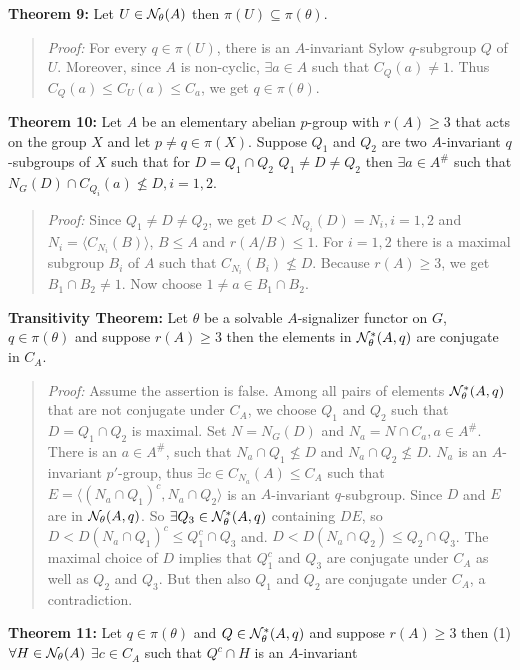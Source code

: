 {\bf Theorem 9:} Let $U \in 
{\cal N}_{\theta}(A)$ then $\pi(U) \subseteq \pi(\theta)$.
\begin{quote}
\emph{Proof:}  
For every $q \in \pi(U)$, there is an $A$-invariant Sylow $q$-subgroup
$Q$ of $U$.  Moreover, since $A$ is non-cyclic, $\exists a \in A$ such that
$C_Q(a) \ne 1$.  Thus $C_Q(a) \le C_U(a) \le C_a$, we get $q \in \pi(\theta)$.
\end{quote}
{\bf Theorem 10:}
Let $A$ be an elementary abelian $p$-group with $r(A) \ge 3$ that acts on the
group $X$ and let $p \ne q \in \pi(X)$.  Suppose $Q_1$
and $Q_2$ are two $A$-invariant $q$-subgroups of $X$ such that for $D= Q_1 \cap Q_2$
$Q_1 \ne D \ne Q_2$ then $\exists a \in A^{\#}$ such that
$N_G(D) \cap C_{Q_i}(a) \nleq D, i= 1, 2$.
\begin{quote}
\emph{Proof:}  
Since $Q_1 \ne D \ne Q_2$, we get $D < N_{Q_i}(D)= N_i , i= 1, 2$ and
$N_i= \langle C_{N_i}(B) \rangle$, $B \le A$ and $r(A/B) \le 1$.  For $i= 1, 2$
there is a maximal subgroup $B_i$ of $A$ such that $C_{N_i}(B_i) \nleq D$.
Because $r(A) \ge 3$, we get $B_1 \cap B_2 \ne 1$.  Now choose $1 \ne a \in B_1 \cap B_2$.
\end{quote}
{\bf Transitivity Theorem:}   Let $\theta$ be a solvable $A$-signalizer functor on $G$, 
$q \in \pi(\theta)$ and suppose $r(A) \ge 3$ then the elements in ${\cal N}^{*}_{\theta}(A, q)$
are conjugate in $C_A$.
\begin{quote}
\emph{Proof:}  
Assume the assertion is false.  Among all pairs of elements
${\cal N}^*_{\theta}(A, q)$ that are not conjugate under $C_A$,
we choose $Q_1$ and $Q_2$ such that $D = Q_1 \cap Q_2$ is maximal.
Set $N= N_G(D)$ and $N_a = N \cap C_a, a \in A^{\#}$.  There is an
$a \in A^{\#}$, such that 
$N_a \cap Q_1 \nleq D$ and
$N_a \cap Q_2 \nleq D$.
$N_a$ is an $A$-invariant $p'$-group, thus $\exists c \in C_{N_a}(A) \le C_A$
such that $E= \langle (N_a \cap Q_1)^c, N_a \cap Q_2 \rangle$ is an
$A$-invariant $q$-subgroup.  Since $D$ and $E$ are in
${\cal N}_{\theta}(A, q)$.  So $\exists Q_3 \in {\cal N}^*_{\theta}(A, q)$
containing $DE$, so
$D < D(N_a \cap Q_1)^c \le Q_1^c \cap Q_3$ and.
$D < D(N_a \cap Q_2) \le Q_2 \cap Q_3$.  The maximal choice of $D$ implies that
$Q_1^c$ and $Q_3$ are conjugate under $C_A$ as well as $Q_2$ and $Q_3$.  But
then also $Q_1$ and $Q_2$ are conjugate under $C_A$, a contradiction.
\end{quote}
{\bf Theorem 11:}
Let $q \in \pi(\theta)$ and
$Q \in {\cal N}^*_{\theta}(A, q)$ and suppose $r(A) \ge 3$ then
(1) $\forall H \in 
{\cal N}_{\theta}(A)$  $\exists c \in C_A$ such that $Q^c \cap H$ is an $A$-invariant
